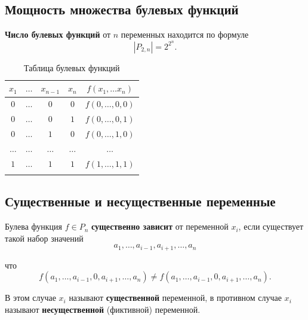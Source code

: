 \documentclass[a5paper, 11pt]{extarticle}
\theoremstyle{definition}
\theoremstyle{definition}
\theoremstyle{definition}
\numberwithin{figure}{section}
\numberwithin{table}{section}
\begin{document}
\subsection{Мощность множества булевых функций}

\textbf{Число булевых функций} от \(n\) переменных находится по формуле
\[
    |P_{2, n}| = 2^{2^n}.
\]

{
\renewcommand*{\arraystretch}{1.5}
\begin{longtable}{|c|c|c|c|c|}
    \hline
    \(x_1\)    & \(\ldots\) & \(x_{n - 1}\) & \(x_n\)    & \(f(x_1, \ldots x_n)\) \\
    \hline
    \(0\)      & \(\ldots\) & \(0\)         & \(0\)      & \(f(0, \ldots, 0, 0)\) \\
    \hline
    \(0\)      & \(\ldots\) & \(0\)         & \(1\)      & \(f(0, \ldots, 0, 1)\) \\
    \hline
    \(0\)      & \(\ldots\) & \(1\)         & \(0\)      & \(f(0, \ldots, 1, 0)\) \\
    \hline
    \(\ldots\) & \(\ldots\) & \(\ldots\)    & \(\ldots\) & \(\ldots\)             \\
    \hline
    \(1\)      & \(\ldots\) & \(1\)         & \(1\)      & \(f(1, \ldots, 1, 1)\) \\
    \hline
    \caption{Таблица булевых функций}
\end{longtable}
}

\subsection{Существенные и несущественные переменные}

Булева функция \(f \in P_n\) \textbf{существенно зависит} от переменной \(x_i\), если существует такой набор значений
\[
    a_1, \ldots, a_{i - 1}, a_{i +1}, \ldots, a_n
\]

что
\[
    f(a_1, \ldots, a_{i - 1}, 0, a_{i +1}, \ldots, a_n) \neq f(a_1, \ldots, a_{i - 1}, 0, a_{i +1}, \ldots, a_n).
\]

В этом случае \(x_i\) называют \textbf{существенной} переменной, в противном случае \(x_i\) называют \textbf{несущественной} (фиктивной) переменной.
\end{document}
